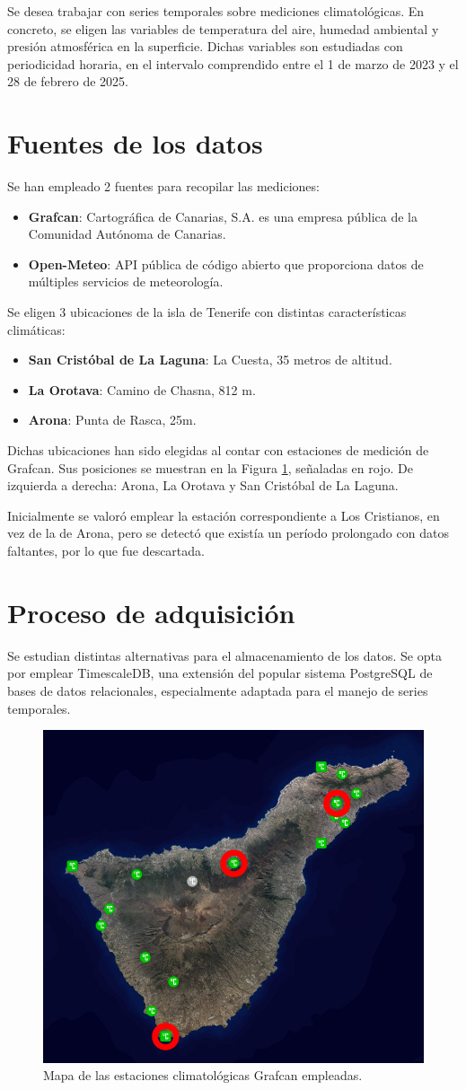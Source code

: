 
Se desea trabajar con series temporales sobre mediciones climatológicas. 
En concreto, se eligen las variables de temperatura del aire, humedad ambiental y presión atmosférica en la superficie.
Dichas variables son estudiadas con periodicidad horaria, en el intervalo comprendido entre el 1 de marzo de 2023 y el 28 de febrero de 2025.
\section{Fuentes de los datos}

Se han empleado 2 fuentes para recopilar las mediciones: 
\begin{itemize}
    \item \textbf{Grafcan}: Cartográfica de Canarias, S.A. es una empresa pública de la Comunidad Autónoma de Canarias.
    \item \textbf{Open-Meteo}: API pública de código abierto que proporciona datos de múltiples servicios de meteorología.
\end{itemize}

Se eligen 3 ubicaciones de la isla de Tenerife con distintas características climáticas:
\begin{itemize}
    \item \textbf{San Cristóbal de La Laguna}: La Cuesta, 35 metros de altitud.
    \item \textbf{La Orotava}: Camino de Chasna, 812 m.
    \item \textbf{Arona}: Punta de Rasca, 25m.
\end{itemize}
Dichas ubicaciones han sido elegidas al contar con estaciones de medición de Grafcan.
Sus posiciones se muestran en la Figura \ref{mapa_estaciones}, señaladas en rojo. De izquierda a derecha: Arona, La Orotava y San Cristóbal de La Laguna.

Inicialmente se valoró emplear la estación correspondiente a Los Cristianos, en vez de la de Arona, pero se detectó que existía un período prolongado con datos faltantes, por lo que fue descartada.
\bigskip

\section{Proceso de adquisición}

Se estudian distintas alternativas para el almacenamiento de los datos.
Se opta por emplear TimescaleDB, una extensión del popular sistema PostgreSQL
de bases de datos relacionales, especialmente adaptada para el manejo de series temporales. 

\begin{figure}[htb]
   \centering
   \includegraphics[width=0.6\linewidth]{images/mapa_estaciones}
   \caption{Mapa de las estaciones climatológicas Grafcan empleadas.}
   \label{mapa_estaciones}
\end{figure}